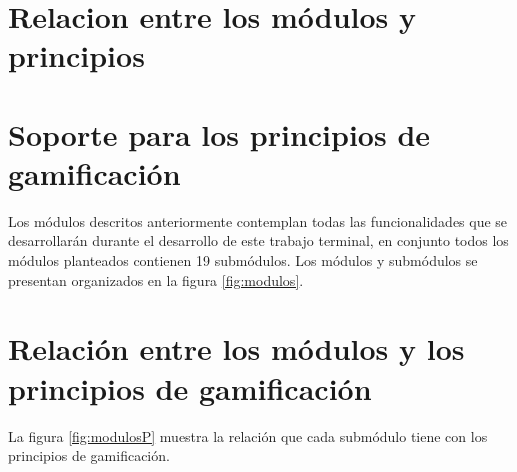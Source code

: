 
\section{Relacion entre los módulos y principios}
\section{Soporte para los principios de gamificación}

 Los módulos descritos anteriormente contemplan todas las funcionalidades que se desarrollarán
 durante el desarrollo de este trabajo terminal, en conjunto todos los módulos planteados contienen
 19 submódulos. Los módulos y submódulos se presentan organizados en la figura \ref{fig:modulos}.\\

 \noindent 

\section{Relación entre los módulos y los principios de gamificación}
\label{analisis:principios}
    
    La figura \ref{fig:modulosP} muestra la relación que cada submódulo tiene con los principios de gamificación.
    
